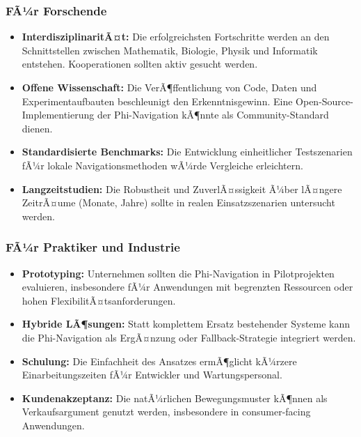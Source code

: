 ﻿\documentclass[a4paper,12pt]{article}
\theoremstyle{definition}
\begin{document}
\subsubsection{FÃ¼r Forschende}

\begin{itemize}
	\item \textbf{InterdisziplinaritÃ¤t:} Die erfolgreichsten Fortschritte werden an den Schnittstellen zwischen Mathematik, Biologie, Physik und Informatik entstehen. Kooperationen sollten aktiv gesucht werden.
	
	\item \textbf{Offene Wissenschaft:} Die VerÃ¶ffentlichung von Code, Daten und Experimentaufbauten beschleunigt den Erkenntnisgewinn. Eine Open-Source-Implementierung der Phi-Navigation kÃ¶nnte als Community-Standard dienen.
	
	\item \textbf{Standardisierte Benchmarks:} Die Entwicklung einheitlicher Testszenarien fÃ¼r lokale Navigationsmethoden wÃ¼rde Vergleiche erleichtern.
	
	\item \textbf{Langzeitstudien:} Die Robustheit und ZuverlÃ¤ssigkeit Ã¼ber lÃ¤ngere ZeitrÃ¤ume (Monate, Jahre) sollte in realen Einsatzszenarien untersucht werden.
\end{itemize}

\subsubsection{FÃ¼r Praktiker und Industrie}

\begin{itemize}
	\item \textbf{Prototyping:} Unternehmen sollten die Phi-Navigation in Pilotprojekten evaluieren, insbesondere fÃ¼r Anwendungen mit begrenzten Ressourcen oder hohen FlexibilitÃ¤tsanforderungen.
	
	\item \textbf{Hybride LÃ¶sungen:} Statt komplettem Ersatz bestehender Systeme kann die Phi-Navigation als ErgÃ¤nzung oder Fallback-Strategie integriert werden.
	
	\item \textbf{Schulung:} Die Einfachheit des Ansatzes ermÃ¶glicht kÃ¼rzere Einarbeitungszeiten fÃ¼r Entwickler und Wartungspersonal.
	
	\item \textbf{Kundenakzeptanz:} Die natÃ¼rlichen Bewegungsmuster kÃ¶nnen als Verkaufsargument genutzt werden, insbesondere in consumer-facing Anwendungen.
\end{itemize}
\end{document}
